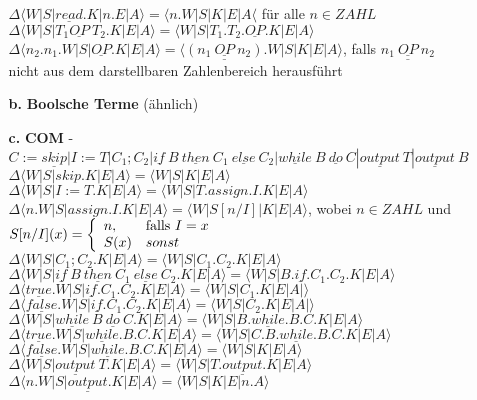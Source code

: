 \begin{enumerate}
\begin{itemize}
	$\Delta\langle W|S|\underline{read}.K|n.E|A\rangle = \langle n.W|S|K|E|A\langle$ für alle $n\in ZAHL$\\
	$\Delta\langle W|S|T_1 \underline{OP}\ T_2.K|E|A\rangle = \langle W|S|T_1.T_2.\underline{OP}.K|E|A\rangle$\\
	$\Delta\langle n_2.n_1.W|S|\underline{OP}.K|E|A\rangle = \langle \underline{(n_1\ \underline{OP}\ n_2)}.W|S|K|E|A\rangle$, falls $\underline{n_1\ \underline{OP}\ n_2}$ nicht aus dem darstellbaren Zahlenbereich herausführt\\
	\item[\textbf{b.}] \textbf{Boolsche Terme} (ähnlich)
	\item[\textbf{c.}] \textbf{COM}  - $C:=\underline{skip}|I:=T|C_1;C_2|\underline{if}\ B\ \underline{then}\ C_1\ \underline{else}\ C_2|\underline{while}\ B\  \underline{do}\ C| \underline{output}\ T|\underline{output}\ B$\\
	$\Delta\langle W|S|skip.K|E|A\rangle = \langle W|S|K|E|A\rangle$\\
	$\Delta\langle W|S|I:=T.K|E|A\rangle = \langle W|S|T.assign.I.K|E|A\rangle$\\
$\Delta\langle n.W|S|assign.I.K|E|A\rangle = \langle W|S[n/I]|K|E|A\rangle$, wobei $n\in ZAHL$ und \\ $S[n/I](x) = \left\lbrace\begin{array}{l l}
n,&\text{falls }I =x\\
	S(x)& sonst\\
\end{array}\right.$\\
	$\Delta\langle W|S|C_1;C_2.K|E|A\rangle = \langle W|S|C_1.C_2.K|E|A\rangle$
	$\Delta\langle W|S|\underline{if}\ B\ \underline{then}\ C_1\ \underline{else}\ C_2.K|E|A\rangle = \langle W|S|B.\underline{if}.C_1.C_2.K|E|A\rangle$\\
	$\Delta\langle \underline{true}.W|S|\underline{if}.C_1.C_2.K|E|A\rangle = \langle W|S|C_1.K|E|A|\rangle$\\
	$\Delta\langle \underline{false}.W|S|\underline{if}.C_1.C_2.K|E|A\rangle = \langle W|S|C_2.K|E|A|\rangle$\\
	$\Delta\langle W|S|\underline{while}\ B\ \underline{do}\ C.K|E|A\rangle = \langle W|S|B.\underline{while}.B.C.K|E|A\rangle$\\
	$\Delta\langle \underline{true}.W|S|\underline{while}.B.C.K|E|A\rangle = \langle W|S|C.B.\underline{while}.B.C.K|E|A\rangle$\\
	$\Delta\langle \underline{false}.W|S|\underline{while}.B.C.K|E|A\rangle = \langle W|S|K|E|A\rangle$\\

	$\Delta\langle W|S|\underline{output}\ T.K|E|A\rangle = \langle W|S|T.\underline{output}.K|E|A\rangle$\\
	$\Delta\langle n.W|S|\underline{output}.K|E|A\rangle = \langle W|S|K|E|n.A\rangle$\\

	\end{itemize}

\end{enumerate}




